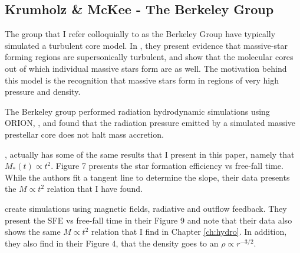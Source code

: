 \documentclass[../dissertation.tex]{subfiles}
\begin{document}
\subsection{Krumholz \& McKee - The Berkeley Group}
The group that I refer colloquially to as the Berkeley Group have typically simulated a turbulent core model.
In \citet{2003ApJ...585..850M}, they present evidence that massive-star forming regions are supersonically turbulent, 
and show that the molecular cores out of which individual massive stars form are as well.
The motivation behind this model is the recognition that massive stars form in regions of very high pressure and density.

The Berkeley group performed radiation hydrodynamic simulations using ORION,
\citep{2009Sci...323..754K}, and found that the radiation pressure emitted by a simulated massive prestellar core does not halt mass accretion. 

\citet{2014MNRAS.439.3420M}, actually has some of the same results that I present in this paper, namely that $M_*(t) \propto t^2$. 
Figure 7 presents the star formation efficiency vs free-fall time. While the authors fit a tangent line to determine the slope, their data presents the $M \propto t^2$ relation that I have found. 

\citet{2018MNRAS.473.4220L} create simulations using magnetic fields, radiative and outflow feedback. 
They present the SFE vs free-fall time in their Figure 9 and note that their data also shows the same $M \propto t^2$ relation that I find in Chapter \ref{ch:hydro}. 
In addition, they also find in their Figure 4, that the density goes to an $\rho \propto r^{-3/2}$.



\end{document}
